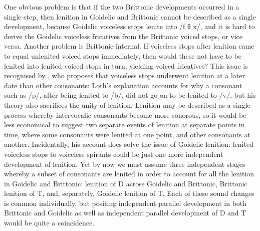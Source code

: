 One obvious problem is that if the two Brittonic developments occurred in a single step, then lenition in Goidelic and Brittonic cannot be described as a single development, because Goidelic voiceless stops lenite into /f θ x/, and it is hard to derive the Goidelic  voiceless fricatives from the Brittonic voiced stops, or vice versa. Another problem is Brittonic-internal. If voiceless stops after lenition came to equal unlenited voiced stops immediately, then would these not have to be lenited into lenited voiced stops in turn, yielding voiced fricatives? This issue is recognised  by \textcite{loth_les_1892}, who proposes that voiceless stops underwent lenition at a later date than other consonants:
Loth's explanation accounts for why a consonant such as /p/, after being lenited to /b/, did not go on to be lenited to /v/, but his theory also sacrifices the unity of lenition. Lenition may be described as a single process whereby intervocalic consonants become more sonorous, so it would be less economical to suggest two separate events of lenition at separate points in time, where some consonants were lenited at one point, and other consonants at another. Incidentally, his account does solve the issue of Goidelic lenition:  lenited voiceless stops to voiceless spirants could be just one more independent development of lenition. Yet by now we must assume three independent stages whereby a subset of consonants are lenited in order to account for all the lenition in Goidelic and Brittonic: lenition of \gls{D} across Goidelic and Brittonic, Brittonic lenition of \gls{T}, and, separately, Goidelic lenition of \gls{T}. Each of these sound changes is common individually, but positing independent parallel development in both Brittonic and Goidelic as well as independent parallel development of \gls{D} and \gls{T} would be quite a coincidence.

